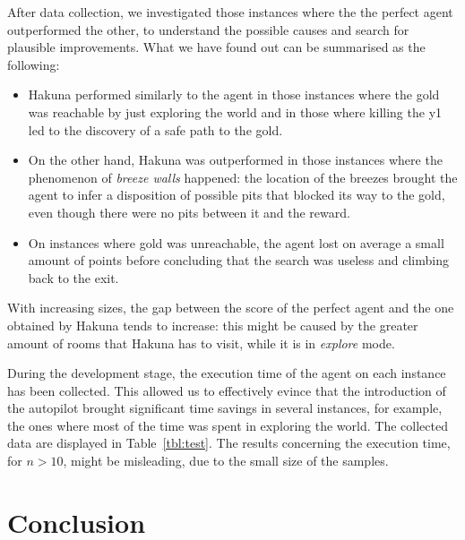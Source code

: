 \documentclass{llncs}
\begin{document}
After data collection, we investigated those instances where the the perfect agent outperformed the other, to understand the possible causes and search for plausible improvements.
What we have found out can be summarised as the following:
\begin{itemize}
	\item Hakuna performed similarly to the agent in those instances where the gold was reachable by just exploring the world and in those where killing the y1 led to the discovery of a safe path to the gold.
	\item On the other hand, Hakuna was outperformed in those instances where the phenomenon of \emph{breeze walls} happened: the location of the breezes brought the agent to infer a disposition of possible pits that blocked its way to the gold, even though there were no pits between it and the reward.
	\item On instances where gold was unreachable, the agent lost on average a small amount of points before concluding that the search was useless and climbing back to the exit.
\end{itemize}

With increasing sizes, the gap between the score of the perfect agent and the one obtained by Hakuna tends to increase: this might be caused by the greater amount of rooms that Hakuna has to visit, while it is in \emph{explore} mode.

During the development stage, the execution time of the agent on each instance has been collected.
This allowed us to effectively evince that the introduction of the autopilot brought significant time savings in several instances, for example, the ones where most of the time was spent in exploring the world.
The collected data are displayed in Table~\ref{tbl:test}.
The results concerning the execution time, for $n > 10$, might be misleading, due to the small size of the samples.

\section{Conclusion}
\end{document}
